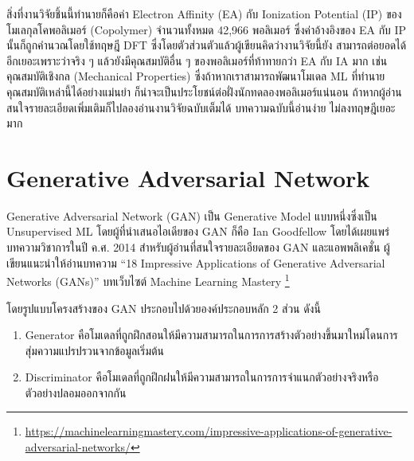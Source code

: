 สิ่งที่งานวิจัยชิ้นนี้ทำนายก็คือค่า Electron Affinity (EA) กับ Ionization Potential (IP) ของโมเลกุลโคพอลิเมอร์ (Copolymer) 
จำนวนทั้งหมด 42,966 พอลิเมอร์ ซึ่งค่าอ้างอิงของ EA กับ IP นั้นก็ถูกคำนวณโดยใช้ทฤษฎี DFT ซึ่งโดยตัวส่วนตัวแล้วผู้เขียนคิดว่างานวิจัยนี้ยัง%
สามารถต่อยอดได้อีกเยอะเพราะว่าจริง ๆ แล้วยังมีคุณสมบัติอื่น ๆ ของพอลิเมอร์ที่ท้าทายกว่า EA กับ IA มาก เช่น คุณสมบัติเชิงกล (Mechanical 
Properties) ซึ่งถ้าหากเราสามารถพัฒนาโมเดล ML ที่ทำนายคุณสมบัติเหล่านี้ได้อย่างแม่นยำ ก็น่าจะเป็นประโยชน์ต่อฝั่งนักทดลองพอลิเมอร์แน่นอน
ถ้าหากผู้อ่านสนใจรายละเอียดเพิ่มเติมก็ไปลองอ่านงานวิจัยฉบับเต็มได้ บทความฉบับนี้อ่านง่าย ไม่ลงทฤษฎีเยอะมาก

\section{Generative Adversarial Network}
\label{sec:gan}

Generative Adversarial Network (GAN) เป็น Generative Model แบบหนึ่งซึ่งเป็น Unsupervised ML โดยผู้ที่นำเสนอไอเดียของ GAN 
ก็คือ Ian Goodfellow โดยได้เผยแพร่บทความวิชาการในปี ค.ศ. 2014\autocite{goodfellow2014b} สำหรับผู้อ่านที่สนใจรายละเอียดของ 
GAN และแอพพลิเคชั่น ผู้เขียนแนะนำให้อ่านบทความ \enquote{18 Impressive Applications of Generative Adversarial Networks 
(GANs)} บทเว็บไซต์ Machine Learning Mastery%
\footnote{\url{https://machinelearningmastery.com/impressive-applications-of-generative-adversarial-networks/}}

\noindent โดยรูปแบบโครงสร้างของ GAN ประกอบไปด้วยองค์ประกอบหลัก 2 ส่วน ดังนี้

\begin{enumerate}
    \item Generator คือโมเดลที่ถูกฝึกสอนให้มีความสามารถในการการสร้างตัวอย่างขึ้นมาใหม่โดนการสุ่มความแปรปรวนจากข้อมูลเริ่มต้น
    \item Discriminator คือโมเดลที่ถูกฝึกฝนให้มีความสามารถในการการจำแนกตัวอย่างจริงหรือตัวอย่างปลอมออกจากกัน
\end{enumerate}

